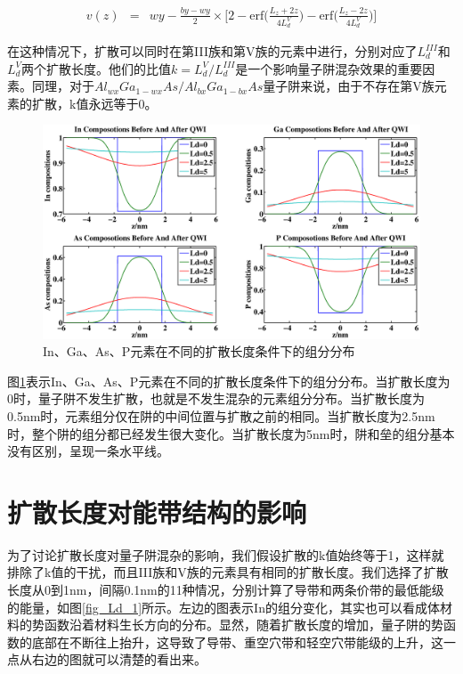 \documentclass[oneside]{ZJUthesis}
\begin{document}
\begin{eqnarray}
    v(z)&=&wy-\frac{by-wy}{2} \times \biggr[2-\textrm{erf}\biggr(\frac{L_z+2z}{4L_d^{V}}\biggr) -\textrm{erf}\biggr(\frac{L_z-2z}{4L_d^{V}}\biggr)\biggr]
\end{eqnarray}

在这种情况下，扩散可以同时在第III族和第V族的元素中进行，分别对应了$L_d^{III}$和$L_d^V$两个扩散长度。他们的比值$k=L_d^V/L_d^{III}$是一个影响量子阱混杂效果的重要因素。同理，对于$Al_{wx}Ga_{1-wx}As/Al_{bx}Ga_{1-bx}As$量子阱来说，由于不存在第V族元素的扩散，k值永远等于0。

\begin{figure}[!t]
    \centering
    \includegraphics[width=1.0\textwidth]{./Pictures/composition.eps}
    \caption{In、Ga、As、P元素在不同的扩散长度条件下的组分分布}
    \label{fig_composition}
\end{figure}

图\ref{fig_composition}表示In、Ga、As、P元素在不同的扩散长度条件下的组分分布。当扩散长度为0时，量子阱不发生扩散，也就是不发生混杂的元素组分分布。当扩散长度为0.5nm时，元素组分仅在阱的中间位置与扩散之前的相同。当扩散长度为2.5nm时，整个阱的组分都已经发生很大变化。当扩散长度为5nm时，阱和垒的组分基本没有区别，呈现一条水平线。

\section{扩散长度对能带结构的影响}

为了讨论扩散长度对量子阱混杂的影响，我们假设扩散的k值始终等于1，这样就排除了k值的干扰，而且III族和V族的元素具有相同的扩散长度。我们选择了扩散长度从0到1nm，间隔0.1nm的11种情况，分别计算了导带和两条价带的最低能级的能量，如图\ref{fig_Ld_1}所示。左边的图表示In的组分变化，其实也可以看成体材料的势函数沿着材料生长方向的分布。显然，随着扩散长度的增加，量子阱的势函数的底部在不断往上抬升，这导致了导带、重空穴带和轻空穴带能级的上升，这一点从右边的图就可以清楚的看出来。
\end{document}
